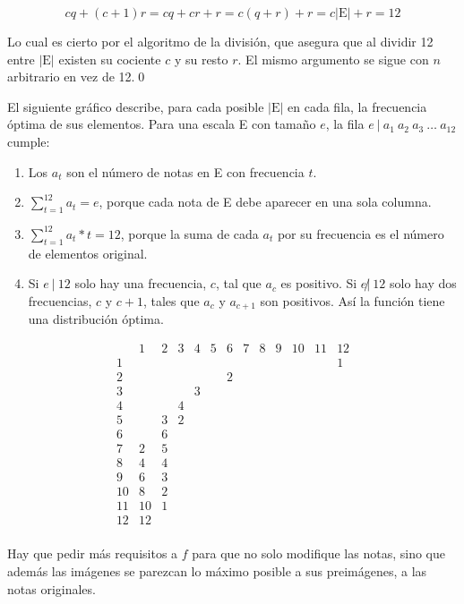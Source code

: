 		$$cq + (c+1)r =
		cq + cr + r =
		c(q+r) + r =
		c|\text{E}| + r = 12$$
		
		Lo cual es cierto por el algoritmo de la división, que asegura que al dividir 12 entre $|\text{E}|$ existen su cociente $c$ y su resto $r$. El mismo argumento se sigue con $n$ arbitrario en vez de 12.\qed
		
		El siguiente gráfico describe, para cada posible $|\text{E}|$ en cada fila, la frecuencia óptima de sus elementos. Para una escala E con tamaño $e$, la fila $e\ |\ a_1\ a_2\ a_3\ \ldots\ a_{12}$ cumple:
		
		\begin{enumerate}
			\item Los $a_t$ son el número de notas en E con frecuencia $t$.
			
			\item $\sum_{t=1}^{12}a_t=e$, porque cada nota de E debe aparecer en una sola columna.
			
			\item $\sum_{t=1}^{12}a_t*t=12$, porque la suma de cada $a_t$ por su frecuencia es el número de elementos original.
			
			\item Si $e\ |\ 12$ solo hay una frecuencia, $c$, tal que $a_c$ es positivo. Si $e\not|\ 12$ solo hay dos frecuencias, $c$ y $c+1$, tales que $a_c$ y $a_{c+1}$ son positivos. Así la función tiene una distribución óptima.
		\end{enumerate}
		
		
		
		$$\begin{array}{l|rrrrrrrrrrrr}
		&1&2&3&4&5&6&7&8&9&10&11&12\\\hline
		1&&&&&&&&&&&&1\\\hline
		2&&&&&&2\\\hline
		3&&&&3\\\hline
		4&&&4\\\hline
		5&&3&2\\\hline
		6&&6\\\hline
		7&2&5\\\hline
		8&4&4\\\hline
		9&6&3\\\hline
		10&8&2\\\hline
		11&10&1\\\hline
		12&12&\\
		\end{array}$$
		
		Hay que pedir más requisitos a $f$ para que no solo modifique las notas, sino que además las imágenes se parezcan lo máximo posible a sus preimágenes, a las notas originales.
		
